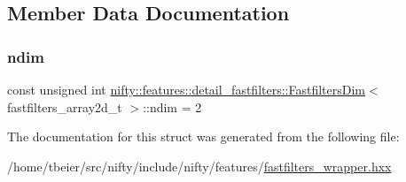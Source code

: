 \subsection{Member Data Documentation}
\mbox{\label{structnifty_1_1features_1_1detail__fastfilters_1_1FastfiltersDim_3_01fastfilters__array2d__t_01_4_ab0716a0f677fcbc75feb94ff1b05604e}} 
\subsubsection{\texorpdfstring{ndim}{ndim}}
{\footnotesize\ttfamily const unsigned int \hyperlink{structnifty_1_1features_1_1detail__fastfilters_1_1FastfiltersDim}{nifty\+::features\+::detail\+\_\+fastfilters\+::\+Fastfilters\+Dim}$<$ fastfilters\+\_\+array2d\+\_\+t $>$\+::ndim = 2\hspace{0.3cm}{\ttfamily [static]}}



The documentation for this struct was generated from the following file\+:\begin{DoxyCompactItemize}
\item 
/home/tbeier/src/nifty/include/nifty/features/\hyperlink{fastfilters__wrapper_8hxx}{fastfilters\+\_\+wrapper.\+hxx}\end{DoxyCompactItemize}
